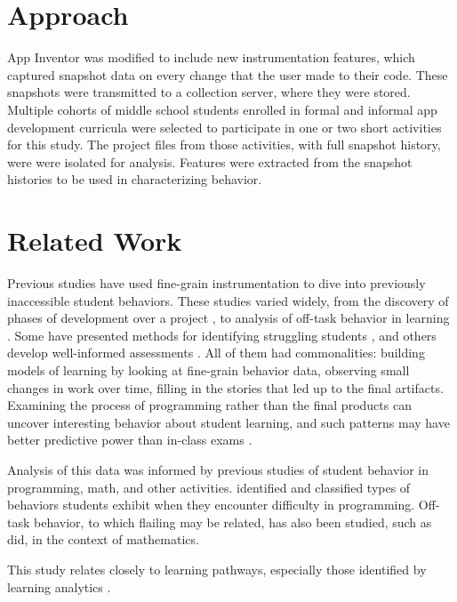 

\section{Approach}
App Inventor was modified to include new instrumentation features, which captured snapshot data on every change that the user made to their code. These snapshots were transmitted to a collection server, where they were stored. Multiple cohorts of middle school students enrolled in formal and informal app development curricula were selected to participate in one or two short activities for this study. The project files from those activities, with full snapshot history, were were isolated for analysis. Features were extracted from the snapshot histories to be used in characterizing behavior. %

\section{Related Work} %
Previous studies have used fine-grain instrumentation to dive into previously inaccessible student behaviors. These studies varied widely, from the discovery of phases of development over a project \citep{berland-2013, martin2013nanogenetic}, to analysis of off-task behavior in learning \citep{baker2004off}. Some have presented methods for identifying struggling students \cite{piech-2012}, and others develop well-informed assessments \citep{werner2012fairy}. All of them had commonalities: building models of learning by looking at fine-grain behavior data, observing small changes in work over time, filling in the stories that led up to the final artifacts. Examining the process of programming rather than the final products can uncover interesting behavior about student learning, and such patterns may have better predictive power than in-class exams \citep{blikstein2014}.

Analysis of this data was informed by previous studies of student behavior in programming, math, and other activities. \cite{perkins-1986} identified and classified types of behaviors students exhibit when they encounter difficulty in programming. Off-task behavior, to which flailing may be related, has also been studied, such as \cite{baker2004off} did, in the context of mathematics. 

This study relates closely to learning pathways, especially those identified by learning analytics \citep{martin2013nanogenetic}. 

